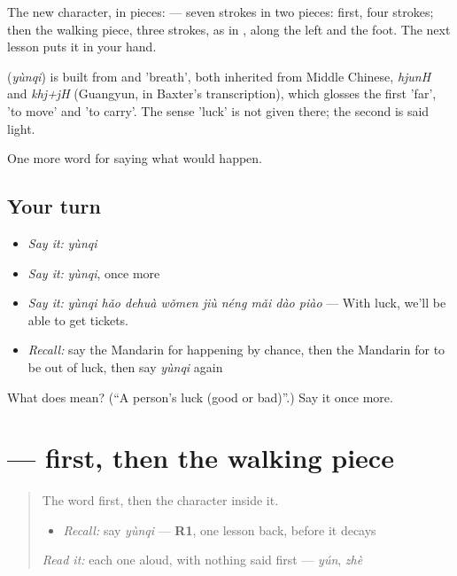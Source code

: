 The new character, in pieces:  — seven strokes in two pieces:  first, four strokes; then the walking piece, three strokes, as in , along the left and the foot. The next lesson puts it in your hand.

\begin{cousinweb}
\textbf{} (\emph{yùnqi}) is built from  and  'breath', both inherited from Middle Chinese, \emph{hjunH} and \emph{khj+jH} (Guangyun, in Baxter's transcription), which glosses the first 'far', 'to move' and 'to carry'. The sense 'luck' is not given there; the second is said light.
\end{cousinweb}

\begin{grammarlens}[title={What you've built}]
One more word for saying what would happen.
\end{grammarlens}

\subsection*{Your turn}
\begin{itemize}
\raggedright
  \item \emph{Say it:} \emph{yùnqi}
  \item \emph{Say it:} \emph{yùnqi}, once more
  \item \emph{Say it:} \emph{yùnqi hǎo dehuà wǒmen jiù néng mǎi dào piào} — With luck, we'll be able to get tickets.
  \item \emph{Recall:} say the Mandarin for happening by chance, then the Mandarin for to be out of luck, then say \emph{yùnqi} again
\end{itemize}

\begin{tcolorbox}[breakable,colback=teal!4,colframe=teal!35!black,title={Before you move on}]
What does  mean? (\textquotedblleft{}A person's luck (good or bad)\textquotedblright{}.) Say it once more.
\end{tcolorbox}
\section[\texorpdfstring{\zh{运} (yùn)}{运 (yùn)}]{ —  first, then the walking piece}

\label{lesson:ZH-W529-yun-luck}



\begin{quote}
The word first, then the character inside it.

\begin{itemize}
\raggedright
  \item \emph{Recall:} say \emph{yùnqi} — \textbf{R1}, one lesson back, before it decays
\end{itemize}

\begin{quote}
 
\end{quote}

\emph{Read it:} each one aloud, with nothing said first — \emph{yún}, \emph{zhè}
\end{quote}

